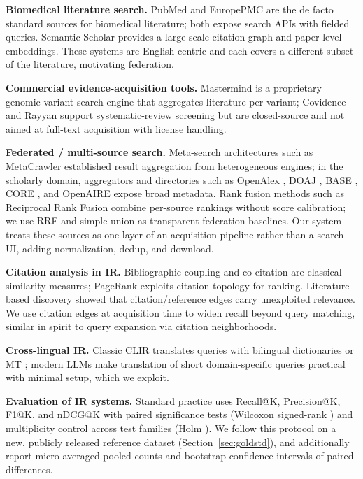 \documentclass[nonacm,sigconf]{acmart}
\begin{document}
\textbf{Biomedical literature search.} PubMed \cite{pubmed} and EuropePMC
\cite{europepmc} are the de facto standard sources for biomedical
literature; both expose search APIs with fielded queries. Semantic Scholar
\cite{kinney2023semantic} provides a large-scale citation graph and
paper-level embeddings. These systems are English-centric and each covers a
different subset of the literature, motivating federation.

\textbf{Commercial evidence-acquisition tools.} Mastermind
\cite{mastermind} is a proprietary genomic variant search engine that
aggregates literature per variant; Covidence \cite{covidence} and Rayyan
\cite{ouzzani2016rayyan} support systematic-review screening but are
closed-source and not aimed at full-text acquisition with license handling.

\textbf{Federated / multi-source search.} Meta-search architectures such as
MetaCrawler \cite{selberg1997metacrawler} established result aggregation
from heterogeneous engines; in the scholarly domain, aggregators and
directories such as
OpenAlex \cite{priem2022openalex}, DOAJ \cite{doaj}, BASE \cite{base},
CORE \cite{core}, and OpenAIRE \cite{openaire} expose broad
metadata. Rank fusion methods such as Reciprocal Rank Fusion
\cite{cormack2009reciprocal} combine per-source rankings without score
calibration; we use RRF and simple union as transparent federation
baselines. Our system treats these sources as one layer of an acquisition
pipeline rather than a search UI, adding normalization, dedup, and download.

\textbf{Citation analysis in IR.} Bibliographic coupling
\cite{kessler1963bibliographic} and co-citation \cite{small1973co} are
classical similarity measures; PageRank \cite{page1999pagerank} exploits
citation topology for ranking. Literature-based discovery
\cite{swanson1986fish} showed that citation/reference edges carry
unexploited relevance. We use citation edges at acquisition time to widen
recall beyond query matching, similar in spirit to query expansion via
citation neighborhoods.

\textbf{Cross-lingual IR.} Classic CLIR translates queries with bilingual
dictionaries or MT \cite{kishida2005technical}; modern LLMs
\cite{brown2020language,kojima2022large} make translation of short
domain-specific queries practical with minimal setup, which we exploit.

\textbf{Evaluation of IR systems.} Standard practice uses Recall@K,
Precision@K, F1@K, and nDCG@K \cite{jarvelin2002cumulated} with paired
significance tests (Wilcoxon signed-rank \cite{wilcoxon1945individual})
and multiplicity control across test families (Holm \cite{holm1979simple}).
We follow this protocol on a new, publicly released reference dataset
(Section~\ref{sec:goldstd}), and additionally report micro-averaged pooled
counts and bootstrap confidence intervals of paired differences.
\end{document}

